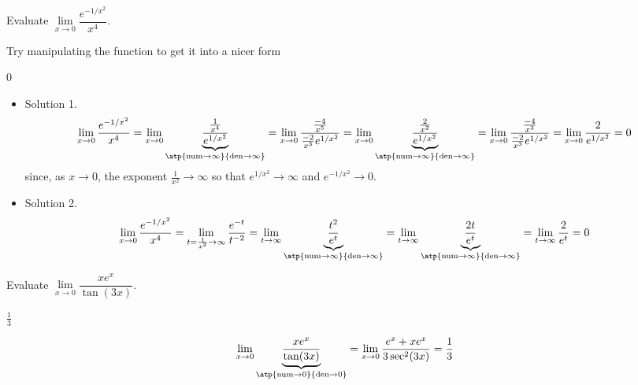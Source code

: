 \begin{Mquestion}[1996D]
Evaluate $\lim\limits_{x\rightarrow 0}\dfrac{e^{-1/x^2}}{x^4}$.
\end{Mquestion}
\begin{hint} Try manipulating the function to get it into a nicer form
\end{hint}
\begin{answer} 0
\end{answer}
\begin{solution}
\begin{itemize}
\item Solution 1.
$$
\lim_{x\rightarrow 0}\frac{e^{-1/x^2}}{x^4}
=\lim_{x\rightarrow 0}\underbrace{\frac{\frac{1}{x^4}}{e^{1/x^2}}}_{\atp
	{\mathrm{num}\to\infty}
	{\mathrm{den}\to\infty}}
=\lim_{x\rightarrow 0}\frac{\frac{-4}{x^5}}{\frac{-2}{x^3}e^{1/x^2}}
=\lim_{x\rightarrow 0}\underbrace{\frac{\frac{2}{x^2}}{e^{1/x^2}}}_{\atp
	{\mathrm{num}\to\infty}
	{\mathrm{den}\to\infty}}
=\lim_{x\rightarrow 0}\frac{\frac{-4}{x^3}}{\frac{-2}{x^3}e^{1/x^2}}
=\lim_{x\rightarrow 0}\frac{2}{e^{1/x^2}}
={0}
$$
since, as $x\rightarrow 0$, the exponent $\frac{1}{x^2}\rightarrow\infty$
so that $e^{1/x^2}\rightarrow\infty$ and $e^{-1/x^2}\rightarrow 0$.
\item Solution 2.
$$
\lim_{x\rightarrow 0}\frac{e^{-1/x^2}}{x^4}
=\lim_{t=\frac{1}{x^2}\rightarrow \infty}\frac{e^{-t}}{t^{-2}}
=\lim_{t\rightarrow \infty}\underbrace{\frac{t^2}{e^{t}}}_{\atp
	{\mathrm{num}\to\infty}
	{\mathrm{den}\to\infty}}
=\lim_{t\rightarrow \infty}\underbrace{\frac{2t}{e^{t}}}_{\atp
	{\mathrm{num}\to\infty}
	{\mathrm{den}\to\infty}}
=\lim_{t\rightarrow \infty}\frac{2}{e^{t}}
={0}
$$
\end{itemize}
\end{solution}




\begin{question}[1998H]
Evaluate $\lim\limits_{x\rightarrow 0}
\dfrac{xe^x}{\tan (3x)}$.
\end{question}
\begin{answer} $\frac{1}{3}$
\end{answer}
\begin{solution} $$
\lim_{x\rightarrow 0}\underbrace{\frac{xe^x}{\tan (3x)}}_{\atp
	{\mathrm{num}\to0}
	{\mathrm{den}\to0}}
= \lim_{x\rightarrow 0}\frac{e^x+xe^x}{3\sec^2 (3x)}
=\frac{1}{3}
$$
\end{solution}



